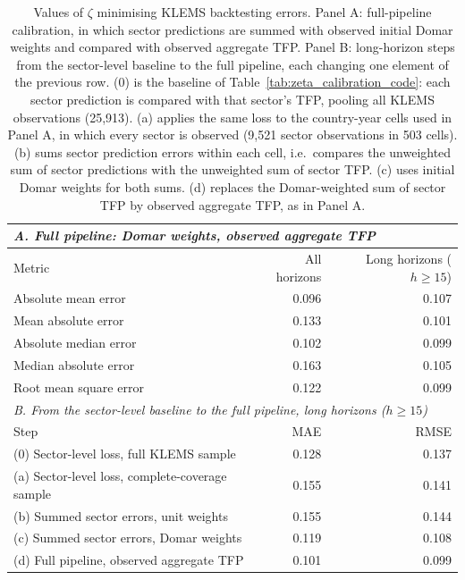 \begin{table}[ht]
\centering
\begin{tabular}{lrr}
  \hline
\multicolumn{3}{l}{\emph{A. Full pipeline: Domar weights, observed aggregate TFP}} \\
  \hline
Metric & All horizons & Long horizons ($h \geq 15$) \\
  \hline
Absolute mean error & 0.096 & 0.107 \\
Mean absolute error & 0.133 & 0.101 \\
Absolute median error & 0.102 & 0.099 \\
Median absolute error & 0.163 & 0.105 \\
Root mean square error & 0.122 & 0.099 \\
  \hline
\multicolumn{3}{l}{\emph{B. From the sector-level baseline to the full pipeline, long horizons ($h \geq 15$)}} \\
  \hline
Step & MAE & RMSE \\
  \hline
(0) Sector-level loss, full KLEMS sample & 0.128 & 0.137 \\
(a) Sector-level loss, complete-coverage sample & 0.155 & 0.141 \\
(b) Summed sector errors, unit weights & 0.155 & 0.144 \\
(c) Summed sector errors, Domar weights & 0.119 & 0.108 \\
(d) Full pipeline, observed aggregate TFP & 0.101 & 0.099 \\
  \hline
\end{tabular}
\caption{Values of $\zeta$ minimising KLEMS backtesting errors. Panel A: full-pipeline calibration, in which sector predictions are summed with observed initial Domar weights and compared with observed aggregate TFP. Panel B: long-horizon steps from the sector-level baseline to the full pipeline, each changing one element of the previous row. (0) is the baseline of Table~\ref{tab:zeta_calibration_code}: each sector prediction is compared with that sector's TFP, pooling all KLEMS observations (25,913). (a) applies the same loss to the country-year cells used in Panel A, in which every sector is observed (9,521 sector observations in 503 cells). (b) sums sector prediction errors within each cell, i.e.\ compares the unweighted sum of sector predictions with the unweighted sum of sector TFP. (c) uses initial Domar weights for both sums. (d) replaces the Domar-weighted sum of sector TFP by observed aggregate TFP, as in Panel A.}
\label{tab_joint_zeta_klems_unit_lambda}
\end{table}

